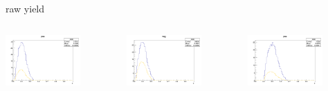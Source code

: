 \begin{frame}{raw yield}
\begin{columns}
\begin{column}[T]{0.25\textwidth}
\includegraphics[width = 0.7\textwidth]{results/yield/statistics/yield_x_Q2_z_0.50_3.979_0.40_pos.png}
\end{column}
\begin{column}[T]{0.25\textwidth}
\includegraphics[width = 0.7\textwidth]{results/yield/statistics/yield_x_Q2_z_0.50_3.979_0.40_neg.png}
\end{column}
\begin{column}[T]{0.25\textwidth}
\includegraphics[width = 0.7\textwidth]{results/yield/statistics/yield_x_Q2_z_0.50_3.979_0.50_pos.png}

\end{column}
\end{columns}
\end{frame}
